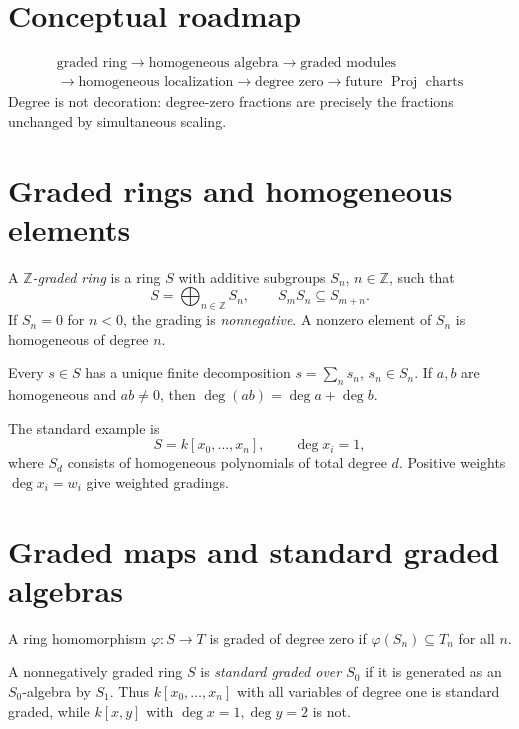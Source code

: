 \section*{Conceptual roadmap}
\[
\boxed{
\begin{array}{c}
\text{graded ring}\to\text{homogeneous algebra}\to\text{graded modules}\\[2pt]
\to\text{homogeneous localization}\to\text{degree zero}
\to\text{future }\operatorname{Proj}\text{ charts}
\end{array}}
\]
Degree is not decoration: degree-zero fractions are precisely the fractions unchanged by simultaneous scaling.



\section{Graded rings and homogeneous elements}
\begin{definition}
A \emph{\(\mathbb Z\)-graded ring} is a ring \(S\) with additive subgroups \(S_n\), \(n\in\mathbb Z\), such that
\[
S=\bigoplus_{n\in\mathbb Z}S_n,\qquad S_mS_n\subseteq S_{m+n}.
\]
If \(S_n=0\) for \(n<0\), the grading is \emph{nonnegative}. A nonzero element of \(S_n\) is homogeneous of degree \(n\).
\end{definition}

Every \(s\in S\) has a unique finite decomposition \(s=\sum_ns_n\), \(s_n\in S_n\). If \(a,b\) are homogeneous and \(ab\neq0\), then \(\deg(ab)=\deg a+\deg b\).

The standard example is
\[
S=k[x_0,\ldots,x_n],\qquad \deg x_i=1,
\]
where \(S_d\) consists of homogeneous polynomials of total degree \(d\). Positive weights \(\deg x_i=w_i\) give weighted gradings.



\section{Graded maps and standard graded algebras}
A ring homomorphism \(\varphi:S\to T\) is graded of degree zero if \(\varphi(S_n)\subseteq T_n\) for all \(n\).

A nonnegatively graded ring \(S\) is \emph{standard graded over \(S_0\)} if it is generated as an \(S_0\)-algebra by \(S_1\). Thus \(k[x_0,\ldots,x_n]\) with all variables of degree one is standard graded, while \(k[x,y]\) with \(\deg x=1,\deg y=2\) is not.

